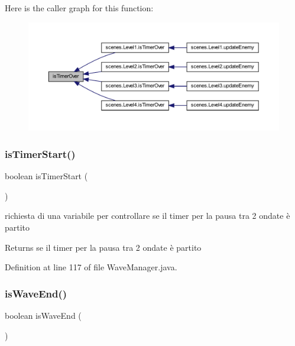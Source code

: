 Here is the caller graph for this function\+:\nopagebreak
\begin{figure}[H]
\begin{center}
\leavevmode
\includegraphics[width=350pt]{classmanagers_1_1_wave_manager_ab68417e6738c05037923f5f0f21eb586_icgraph}
\end{center}
\end{figure}
\mbox{\label{classmanagers_1_1_wave_manager_a6623bf1d5b1d16d74e9dd7e4d1b754f4}} 
\subsubsection{\texorpdfstring{is\+Timer\+Start()}{isTimerStart()}}
{\footnotesize\ttfamily boolean is\+Timer\+Start (\begin{DoxyParamCaption}{ }\end{DoxyParamCaption})}



richiesta di una variabile per controllare se il timer per la pausa tra 2 ondate è partito 

\begin{DoxyReturn}{Returns}
se il timer per la pausa tra 2 ondate è partito 
\end{DoxyReturn}


Definition at line 117 of file Wave\+Manager.\+java.

\mbox{\label{classmanagers_1_1_wave_manager_a1012ba37c40b76ee9c3413986133d865}} 
\subsubsection{\texorpdfstring{is\+Wave\+End()}{isWaveEnd()}}
{\footnotesize\ttfamily boolean is\+Wave\+End (\begin{DoxyParamCaption}{ }\end{DoxyParamCaption})}



